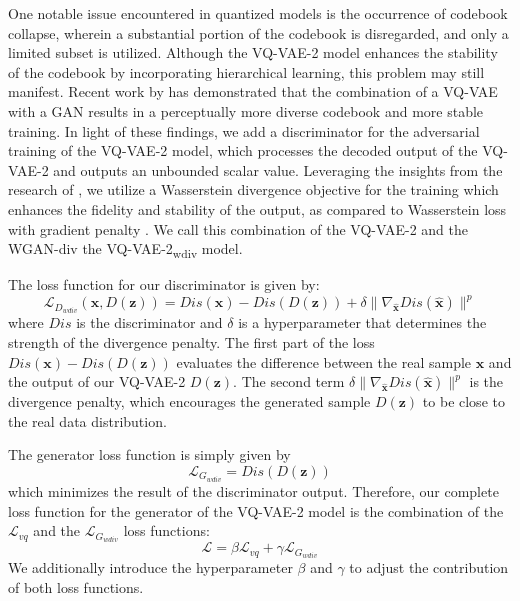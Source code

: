 \documentclass[sigconf]{acmart}
\begin{document}
One notable issue encountered in quantized models is the occurrence of codebook collapse, wherein a substantial portion of the codebook is disregarded, and only a limited subset is utilized. Although the VQ-VAE-2 model enhances the stability of the codebook by incorporating hierarchical learning, this problem may still manifest. Recent work by \citet{esserTamingTransformersHighResolution2021} has demonstrated that the combination of a VQ-VAE with a GAN results in a perceptually more diverse codebook and more stable training. In light of these findings, we add a discriminator for the adversarial training of the VQ-VAE-2 model, which processes the decoded output of the VQ-VAE-2 and outputs an unbounded scalar value. Leveraging the insights from the research of \citet{wu2018wasserstein}, we utilize a Wasserstein divergence objective for the training which enhances the fidelity and stability of the output, as compared to Wasserstein loss with gradient penalty \cite{gulrajani2017improved}. We call this combination of the VQ-VAE-2 and the WGAN-div the VQ-VAE-2\textsubscript{wdiv} model.

The loss function for our discriminator is given by:
\begin{equation}\label{eq:loss_vqvae_wgan_div_dis}
\mathcal{L}_{D_{wdiv}}(\mathbf{x}, D(\mathbf{z}))  = Dis(\mathbf{x}) - Dis(D(\mathbf{z})) + \delta \|\nabla_{\mathbf{\hat{x}}} Dis(\mathbf{\hat{x}})\|^p
\end{equation}
where $Dis$ is the discriminator and $\delta$ is a hyperparameter that determines the strength of the divergence penalty. The first part of the loss $Dis(\mathbf{x}) - Dis(D(\mathbf{z}))$ evaluates the difference between the real sample $\mathbf{x}$ and the output of our VQ-VAE-2 $D(\mathbf{z})$. The second term $\delta \|\nabla_{\mathbf{\hat{x}}} Dis(\mathbf{\hat{x}})\|^p$ is the divergence penalty, which encourages the generated sample $D(\mathbf{z})$ to be close to the real data distribution.

The generator loss function is simply given by
\begin{equation}\label{eq:loss_vqvae_wgan_div_gen}
\mathcal{L}_{G_{wdiv}} = Dis(D(\mathbf{z}))
\end{equation}
which minimizes the result of the discriminator output. Therefore, our complete loss function for the generator of the VQ-VAE-2 model is the combination of the $\mathcal{L}_{vq}$ and the $\mathcal{L}_{G_{wdiv}}$ loss functions: 
\begin{equation}\label{eq:loss_vqvae_full}
\mathcal{L} = \beta\mathcal{L}_{vq} + \gamma\mathcal{L}_{G_{wdiv}}
\end{equation}
We additionally introduce the hyperparameter $\beta$ and $\gamma$ to adjust the contribution of both loss functions.
 
\end{document}
